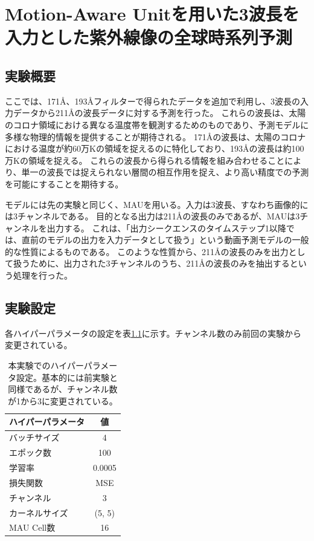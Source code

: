 \chapter{Motion-Aware Unitを用いた3波長を入力とした紫外線像の全球時系列予測}
  \section{実験概要}
    ここでは、171Å、193Åフィルターで得られたデータを追加で利用し、3波長の入力データから211Åの波長データに対する予測を行った。
    これらの波長は、太陽のコロナ領域における異なる温度帯を観測するためのものであり、予測モデルに多様な物理的情報を提供することが期待される。
    171Åの波長は、太陽のコロナにおける温度が約60万Kの領域を捉えるのに特化しており、193Åの波長は約100万Kの領域を捉える。
    これらの波長から得られる情報を組み合わせることにより、単一の波長では捉えられない層間の相互作用を捉え、より高い精度での予測を可能にすることを期待する。
    
    モデルには先の実験と同じく、MAUを用いる。入力は3波長、すなわち画像的には3チャンネルである。
    目的となる出力は211Åの波長のみであるが、MAUは3チャンネルを出力する。
    これは、「出力シークエンスのタイムステップ1以降では、直前のモデルの出力を入力データとして扱う」という動画予測モデルの一般的な性質によるものである。
    このような性質から、211Åの波長のみを出力として扱うために、出力された3チャンネルのうち、211Åの波長のみを抽出するという処理を行った。
  
  \section{実験設定}
    各ハイパーパラメータの設定を表\ref{tab:exp1_hyperparameters}に示す。チャンネル数のみ前回の実験から変更されている。
    \begin{table}[h]
      \centering
      \begin{tabular}{lc}
      \hline
      ハイパーパラメータ & 値 \\
      \hline\hline
      バッチサイズ & 4 \\
      \hline
      エポック数 & 100 \\
      \hline
      学習率 & 0.0005 \\
      \hline
      損失関数 & MSE \\
      \hline
      チャンネル & 3 \\
      \hline
      カーネルサイズ & (5, 5) \\
      \hline
      MAU Cell数 & 16 \\
      \hline
      \end{tabular}
      \caption{本実験でのハイパーパラメータ設定。基本的には前実験と同様であるが、チャンネル数が1から3に変更されている。}
      \label{tab:exp1_hyperparameters}
    \end{table}

